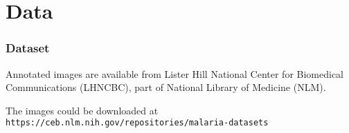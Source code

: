 \section{Data}

\begin{frame}[fragile]
  \frametitle{Dataset}
  Annotated images are available from Lister Hill National Center for Biomedical Communications (LHNCBC), part of National Library of Medicine (NLM).\\

  \vspace{3mm}

  The images could be downloaded at\\
  \verb|https://ceb.nlm.nih.gov/repositories/malaria-datasets|
  
\end{frame}
